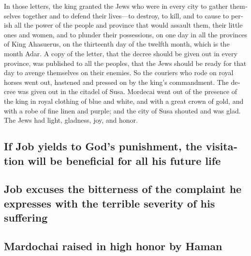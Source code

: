 \begin{paracol}{2}
\begin{otherlanguage}{english}
 In those letters, the king granted the Jews who were in
every city to gather themselves together and to defend their lives---to
destroy, to kill, and to cause to perish all the power of the people and
province that would assault them, their little ones and women, and to
plunder their possessions,  on one day in all the
provinces of King Ahasuerus, on the thirteenth day of the twelfth month,
which is the month Adar.  A copy of the letter, that the
decree should be given out in every province, was published to all the
peoples, that the Jews should be ready for that day to avenge themselves
on their enemies.  So the couriers who rode on royal
horses went out, hastened and pressed on by the king's commandment. The
decree was given out in the citadel of Susa.  Mordecai
went out of the presence of the king in royal clothing of blue and
white, and with a great crown of gold, and with a robe of fine linen and
purple; and the city of Susa shouted and was glad.  The
Jews had light, gladness, joy, and honor.

\hypertarget{if-job-yields-to-gods-punishment-the-visitation-will-be-beneficial-for-all-his-future-life}{%
\subsection{If Job yields to God's punishment, the visitation will be
beneficial for all his future
life}\label{if-job-yields-to-gods-punishment-the-visitation-will-be-beneficial-for-all-his-future-life}}

\hypertarget{job-excuses-the-bitterness-of-the-complaint-he-expresses-with-the-terrible-severity-of-his-suffering}{%
\subsection{Job excuses the bitterness of the complaint he expresses
with the terrible severity of his
suffering}\label{job-excuses-the-bitterness-of-the-complaint-he-expresses-with-the-terrible-severity-of-his-suffering}}

\hypertarget{mardochai-raised-in-high-honor-by-haman}{%
\subsection{Mardochai raised in high honor by
Haman}\label{mardochai-raised-in-high-honor-by-haman}}

\hypertarget{haman-unintentionally-makes-the-king-decide-on-an-extraordinary-honor-for-mardochai-and-carry-it-out-personally}{%
}
\end{otherlanguage}
\end{paracol}
